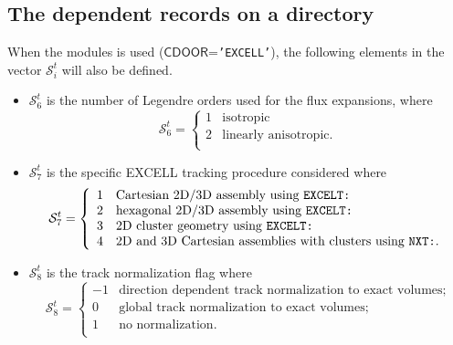 \subsection{The  dependent records on a
 directory}\label{sect:excelltrackingdir}

When the  modules is used ($\mathsf{CDOOR}$={\tt 'EXCELL'}), the following elements in the vector
$\mathcal{S}^{t}_{i}$ will also be defined.

\begin{itemize}
\item $\mathcal{S}^{t}_{6}$ is the number of Legendre orders used for the flux expansions, where
\begin{displaymath}
\mathcal{S}^{t}_{6} = \left\{
\begin{array}{rl}
 1 & \textrm{isotropic} \\
 2 & \textrm{linearly anisotropic.} \\
\end{array} \right.
\end{displaymath}

\item $\mathcal{S}^{t}_{7}$ is the specific EXCELL tracking procedure considered where
\begin{displaymath}
\mathcal{S}^{t}_{7} = \left\{
\begin{array}{rl}
 1 & \textrm{Cartesian 2D/3D assembly using {\tt EXCELT:}} \\
 2 & \textrm{hexagonal 2D/3D assembly using {\tt EXCELT:}} \\
 3 & \textrm{2D cluster geometry using {\tt EXCELT:}} \\
 4 & \textrm{2D and 3D Cartesian assemblies with clusters using {\tt NXT:}.} \\
\end{array} \right.
\end{displaymath}

\item $\mathcal{S}^{t}_{8}$ is the track normalization flag where
\begin{displaymath}
\mathcal{S}^{t}_{8} = \left\{
\begin{array}{rl}
 -1 & \textrm{direction dependent track normalization to exact volumes;} \\
 0 & \textrm{global track normalization to exact volumes;} \\
 1 & \textrm{no normalization.} \\
\end{array} \right.
\end{displaymath}


\end{itemize}
